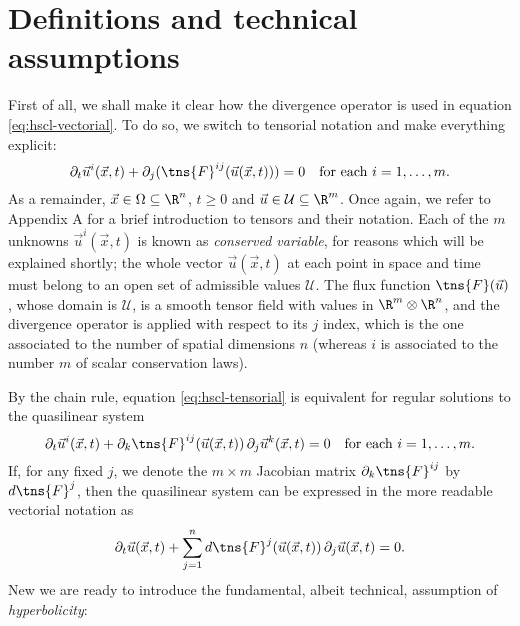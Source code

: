 \section{Definitions and technical assumptions}

First of all, we shall make it clear how the divergence operator
is used in equation \eqref{eq:hscl-vectorial}.
To do so, we switch to tensorial notation and make everything explicit:
\begin{equation} \label{eq:hscl-tensorial}
\partial_t \vec{u}^i(\vec{x},t) + \partial_j (\tns{F}^{ij}(\vec{u}(\vec{x},t))) = 0
\quad \text{for each $i = 1, \dots, m$.}
\end{equation}
As a remainder, $\vec{x} \in \Omega \subseteq \R^n$, $t \geq 0$ and
$\vec{u} \in \mathcal{U} \subseteq \R^m$.
Once again, we refer to Appendix A for a brief introduction
to tensors and their notation.
Each of the $m$ unknowns $\vec{u}^i(\vec{x},t)$ is known as
\emph{conserved variable}, for reasons which will be explained shortly;
the whole vector $\vec{u}(\vec{x},t)$ at each point in space and time must belong
to an open set of admissible values $\mathcal{U}$.
The flux function $\tns{F}(\vec{u})$, whose domain is $\mathcal{U}$,
is a smooth tensor field with values in $\R^m \otimes \R^n$,
and the divergence operator is applied with respect
to its $j$ index, which is the one associated to the number
of spatial dimensions $n$ (whereas $i$ is associated to the number $m$ of
scalar conservation laws).

By the chain rule, equation \eqref{eq:hscl-tensorial} is equivalent
for regular solutions to the quasilinear system
\begin{equation} \label{eq:hscl-quasilinear-tensorial}
\partial_t \vec{u}^i(\vec{x},t)
+  \partial_k \tns{F}^{ij} (\vec{u}(\vec{x},t))
\, \partial_j \vec{u}^k (\vec{x},t) = 0
\quad \text{for each $i = 1, \dots, m$.}
\end{equation}
If, for any fixed $j$, we denote the $m \times m$ Jacobian matrix
$\partial_k \tns{F}^{ij}$ by $d\tns{F}^j$, then the quasilinear system
can be expressed in the more readable vectorial notation as
\begin{equation} \label{eq:hscl-quasilinear-vectorial}
\partial_t \vec{u}(\vec{x},t)
+ \sum_{j=1}^n d\tns{F}^j(\vec{u}(\vec{x},t))
\, \partial_j \vec{u}(\vec{x},t) = 0.
\end{equation}
New we are ready to introduce the fundamental, albeit technical,
assumption of \emph{hyperbolicity}:

